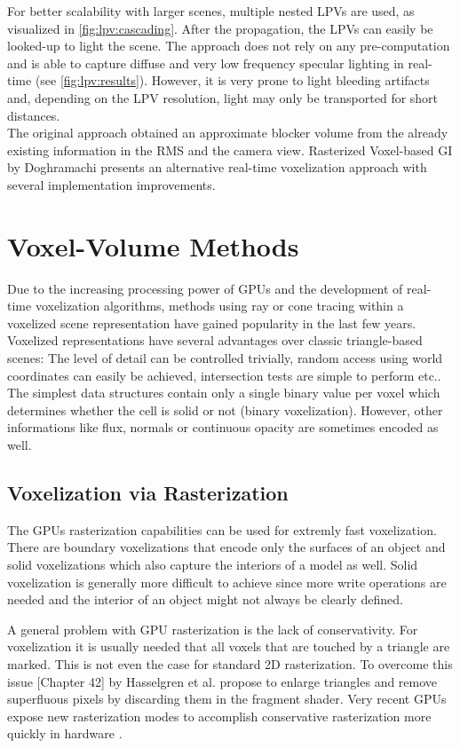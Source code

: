 \documentclass[thesis.tex]{subfiles}
\begin{document}
For better scalability with larger scenes, multiple nested LPVs are used, as visualized in \autoref{fig:lpv:cascading}.
After the propagation, the LPVs can easily be looked-up to light the scene.
The approach does not rely on any pre-computation and is able to capture diffuse and very low frequency specular lighting in real-time (see \autoref{fig:lpv:results}).
However, it is very prone to light bleeding artifacts and, depending on the LPV resolution, light may only be transported for short distances.
\\
The original approach obtained an approximate blocker volume from the already existing information in the RMS and the camera view.
Rasterized Voxel-based GI by Doghramachi \cite{bib:rasterizedvbgi} presents an alternative real-time voxelization approach with several implementation improvements.

\section{Voxel-Volume Methods} \label{sec:prev:voxelmethods}
Due to the increasing processing power of GPUs and the development of real-time voxelization algorithms, methods using ray or cone tracing within a voxelized scene representation have gained popularity in the last few years.
Voxelized representations have several advantages over classic triangle-based scenes:
The level of detail can be controlled trivially, random access using world coordinates can easily be achieved, intersection tests are simple to perform etc..
The simplest data structures contain only a single binary value per voxel which determines whether the cell is solid or not (binary voxelization).
However, other informations like flux, normals or continuous opacity are sometimes encoded as well.

\subsection{Voxelization via Rasterization}
The GPUs rasterization capabilities can be used for extremly fast voxelization.
There are boundary voxelizations that encode only the surfaces of an object and solid voxelizations which also capture the interiors of a model as well.
Solid voxelization is generally more difficult to achieve since more write operations are needed and the interior of an object might not always be clearly defined.

A general problem with GPU rasterization is the lack of conservativity. 
For voxelization it is usually needed that all voxels that are touched by a triangle are marked.
This is not even the case for standard 2D rasterization.
To overcome this issue \cite{bib:GPUGems2}[Chapter 42] by Hasselgren et al. propose to enlarge triangles and remove superfluous pixels by discarding them in the fragment shader.
Very recent GPUs expose new rasterization modes to accomplish conservative rasterization more quickly in hardware \cite{bib:nvconservativeraster}.
\end{document}
